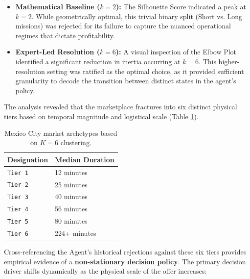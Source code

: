 \begin{itemize}
    \item \textbf{Mathematical Baseline ($k=2$):} The Silhouette Score indicated a peak at $k=2$. While geometrically optimal, this trivial binary split (Short vs. Long missions) was rejected for its failure to capture the nuanced operational regimes that dictate profitability.
    \item \textbf{Expert-Led Resolution ($k=6$):} A visual inspection of the Elbow Plot identified a significant reduction in inertia occurring at $k=6$. This higher-resolution setting was ratified as the optimal choice, as it provided sufficient granularity to decode the transition between distinct states in the agent’s policy.
\end{itemize}

The analysis revealed that the marketplace fractures into six distinct physical tiers based on temporal magnitude and logistical scale (Table \ref{tab:mission_tiers}). 

\begin{table}[H]
    \centering
    \small
    \begin{tabular}{l l}
        \toprule
        \textbf{Designation} & \textbf{Median Duration}\footnotemark \\
        \midrule
        \texttt{Tier 1} & 12 minutes \\
        \texttt{Tier 2} & 25 minutes \\
        \texttt{Tier 3} & 40 minutes \\
        \texttt{Tier 4} & 56 minutes \\
        \texttt{Tier 5} & 80 minutes \\
        \texttt{Tier 6} & 224+ minutes \\
        \bottomrule
    \end{tabular}
    \caption{Mexico City market archetypes based on $K=6$ clustering.} 
    \label{tab:mission_tiers} 
\end{table}

Cross-referencing the Agent's historical rejections against these six tiers provides empirical evidence of a \textbf{non-stationary decision policy}. The primary decision driver shifts dynamically as the physical scale of the offer increases:

